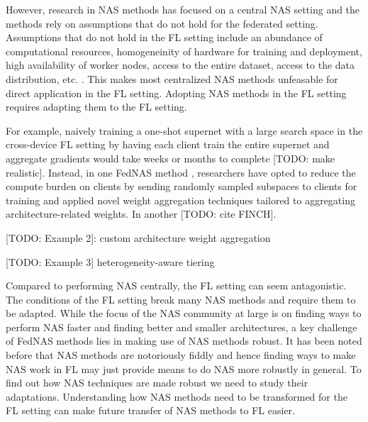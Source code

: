 However, research in NAS methods has focused on a central NAS setting and the methods rely on assumptions that do not hold for the federated setting. Assumptions that do not hold in the FL setting include an abundance of computational resources, homogeneinity of hardware for training and deployment, high availability of worker nodes, access to the entire dataset, access to the data distribution, etc. \cite{fl_advances_and_open_problems_2021}. This makes most centralized NAS methods unfeasable for direct application in the FL setting. Adopting NAS methods in the FL setting requires adapting them to the FL setting. 


For example, naively training a one-shot supernet with a large search space in the cross-device FL setting by having each client train the entire supernet and aggregate gradients would take weeks or months to complete [TODO: make realistic]. Instead, in one FedNAS method \cite{fedoras_2022}, researchers have opted to reduce the compute burden on clients by sending randomly sampled subspaces to clients for training and applied novel weight aggregation techniques tailored to aggregating architecture-related weights. In another [TODO: cite FINCH].

[TODO: Example 2]: custom architecture weight aggregation

[TODO: Example 3] heterogeneity-aware tiering

Compared to performing NAS centrally, the FL setting can seem antagonistic. The conditions of the FL setting break many NAS methods and require them to be adapted. While the focus of the NAS community at large is on finding ways to perform NAS faster and finding better and smaller architectures, a key challenge of FedNAS methods lies in making use of NAS methods robust. It has been noted before that NAS methods are notoriously fiddly and hence finding ways to make NAS work in FL may just provide means to do NAS more robustly in general. To find out how NAS techniques are made robust we need to study their adaptations. Understanding how NAS methods need to be transformed for the FL setting can make future transfer of NAS methods to FL easier.

